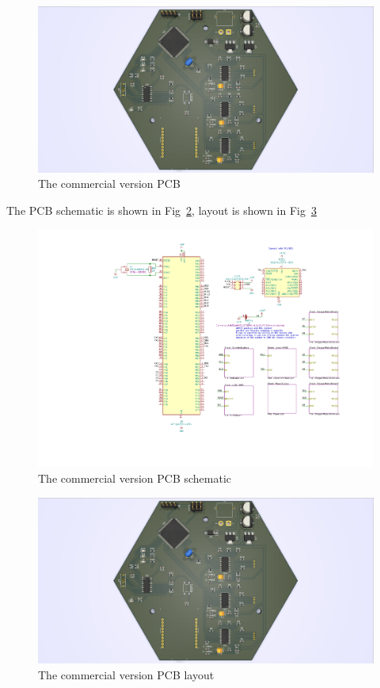 \documentclass[sigconf]{acmart}
\begin{document}
\begin{figure}[h]
  \centering
  \includegraphics[width=\linewidth]{MainPCB.png}
  \caption{The commercial version PCB}
  \label{fig:MainPCB}
\end{figure}

The PCB schematic is shown in Fig~\ref{fig:MainPCBschematic}, layout is shown in Fig~\ref{fig:MainPCBlayout}

\begin{figure}[h]
  \centering
  \includegraphics[width=\linewidth]{MisakaPCBv3-1.pdf}
  \caption{The commercial version PCB schematic}
  \label{fig:MainPCBschematic}
\end{figure}

\begin{figure}[h]
  \centering
  \includegraphics[width=\linewidth]{MainPCB.png}
  \caption{The commercial version PCB layout}
  \label{fig:MainPCBlayout}
\end{figure}
\end{document}
